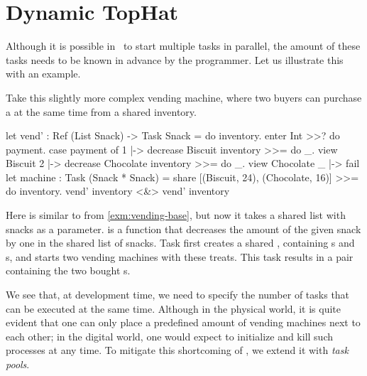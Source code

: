 
\newpage

\section{Dynamic TopHat}
\label{sec:dyntophat}


Although it is possible in \TOPHAT\ to start multiple tasks in parallel,
the amount of these tasks needs to be known in advance by the programmer.
Let us illustrate this with an example.

\begin{example}
  \label{exm:vending-shared}
  Take this slightly more complex vending machine,
  where two buyers can purchase a  at the same time from a shared inventory.

  \begin{TASK}[emph={inventory,payment}]
    let vend' : Ref (List Snack) -> Task Snack = do inventory.
      enter Int >>? do payment.
      case payment of
        1 |-> decrease Biscuit inventory >>= do _.
             view Biscuit
        2 |-> decrease Chocolate inventory >>= do _.
             view Chocolate
        _ |-> fail
    let machine : Task (Snack * Snack) =
      share [(Biscuit, 24), (Chocolate, 16)] >>= do inventory.
      vend' inventory <&> vend' inventory
  \end{TASK}

  Here  is similar to  from \cref{exm:vending-base},
  but now it takes a shared list with snacks as a parameter.
   is a function that decreases the amount of the given snack by one in the shared list of snacks.
  Task  first creates a shared ,
  containing s and s,
  and starts two vending machines with these treats.
  This task results in a pair containing the two bought s.
\end{example}

We see that, at development time, we need to specify the number of  tasks that can be executed at the same time.
Although in the physical world, it is quite evident that one can only place a predefined amount of vending machines next to each other;
in the digital world, one would expect to initialize and kill such processes at any time.
To mitigate this shortcoming of \TOPHAT, we extend it with \emph{task pools}.


